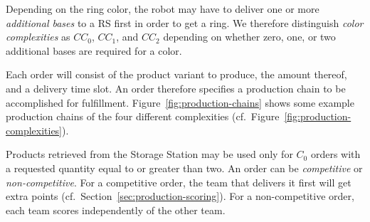 \documentclass[12pt,twoside]{article}
\newcommand{\refsec}[1]{Section~\ref{#1}}
\newcommand{\reffig}[1]{Figure~\ref{#1}}
\begin{document}
Depending on the ring color, the robot may have to deliver one or more
\emph{additional bases} to a RS first in order to get a ring. We
therefore distinguish \emph{color complexities} as $CC_0$, $CC_1$, and
$CC_2$ depending on whether zero, one, or two additional bases are
required for a color.

Each order will consist of the product variant to
produce, the amount thereof, and a delivery time slot. An order
therefore specifies a production chain to be accomplished for
fulfillment. \reffig{fig:production-chains} shows some example
production chains of the four different complexities
(cf.~\reffig{fig:production-complexities}).

Products retrieved from the Storage Station may be used only for
$C_0$ orders with a requested quantity equal to or greater than two.
An order can be \emph{competitive} or \emph{non-competitive}. For a competitive
order, the team that delivers it first will get extra points
(cf.~\refsec{sec:production-scoring}).
For a non-competitive order, each team scores independently of the other team.
\end{document}
